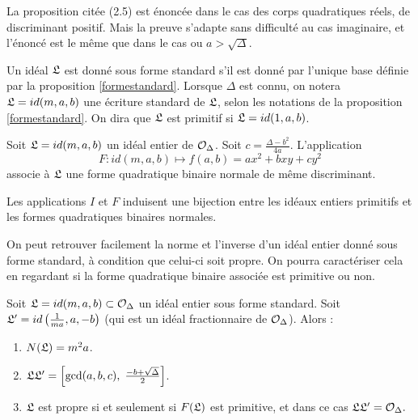 \begin{Rem}
	La proposition citée \cite{Buchmann95}(2.5) est énoncée dans le cas des corps quadratiques réels, de discriminant positif. Mais la preuve s'adapte sans difficulté au cas imaginaire, et l'énoncé est le même que dans le cas ou $a > \sqrt{\Delta}$.
\end{Rem}

\begin{Def}
	Un idéal $\mathfrak{L}$ est donné sous forme standard s'il est donné par l'unique base définie par la proposition \ref{formestandard}. Lorsque $\Delta$ est connu, on notera $\mathfrak{L} = id(m,a,b)$ une écriture standard de $\mathfrak{L}$, selon les notations de la proposition \ref{formestandard}. On dira que $\mathfrak{L}$ est primitif si $\mathfrak{L} = id(1,a,b)$.
\end{Def}

\begin{Coro}\label{applicationFformeD'unIdeal}
	Soit $\mathfrak{L} = id(m,a,b)$ un idéal entier de $\mathcal{O}_{\Delta}$. Soit $c = \frac{\Delta - b^2}{4a}$. L'application
	\begin{equation*}
		F : id(m,a,b)\mapsto f(a,b) = ax^2 + bxy + cy^2
	\end{equation*}
	associe à $\mathfrak{L}$ une forme quadratique binaire normale de même discriminant. 
\end{Coro}

\begin{Prop}
	Les applications $I$ et $F$ induisent une bijection entre les idéaux entiers primitifs et les formes quadratiques binaires normales.
\end{Prop}

On peut retrouver facilement la norme et l'inverse d'un idéal entier donné sous forme standard, à condition que celui-ci soit propre. On pourra caractériser cela en regardant si la forme quadratique binaire associée est primitive ou non. 

\begin{Prop}
	
	Soit $\mathfrak{L} = id(m,a,b)\subset\mathcal{O}_{\Delta}$ un idéal entier sous forme standard. Soit $\mathfrak{L}' = id\left( \frac{1}{ma},a,-b\right) $ (qui est un idéal fractionnaire de $\mathcal{O}_{\Delta}$). Alors :
	\begin{enumerate}
		\item $N(\mathfrak{L}) = m^2a$.
		\item $\mathfrak{L}\mathfrak{L}' = \left[ \gcd(a,b,c),\;\frac{-b + \sqrt{\Delta}}{2}\right]$.
		\item $\mathfrak{L}$ est propre si et seulement si $F(\mathfrak{L})$ est primitive, et dans ce cas $\mathfrak{L}\mathfrak{L}' = \mathcal{O}_{\Delta}.$
	\end{enumerate}
\end{Prop}

